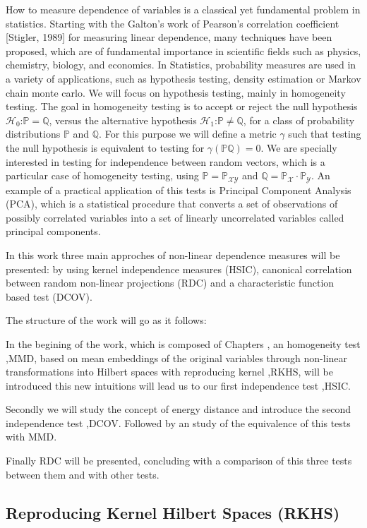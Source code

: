 How  to  measure  dependence  of  variables  is  a  classical yet fundamental problem in statistics.  Starting with the Galton’s work of Pearson’s correlation coefficient [Stigler, 1989] for measuring linear dependence,  many  techniques  have  been proposed, which are of fundamental importance in scientific fields such as physics, chemistry, biology, and economics.
In Statistics, probability measures are used in a variety of applications, such as hypothesis testing, density estimation or Markov chain monte carlo. We will focus on hypothesis testing, mainly in homogeneity testing. 
The goal in homogeneity testing is to accept or reject the null hypothesis $\mathcal{H}_{0}$:$\mathbb{P}=\mathbb{Q}$, versus the alternative hypothesis $\mathcal{H}_{1}$:$\mathbb{P}\neq\mathbb{Q}$, for a class of probability distributions $\mathbb{P}$ and $\mathbb{Q}$. For this purpose we will define a metric $\gamma$ such that testing the null hypothesis is equivalent to testing for $\gamma(\mathbb{P}\mathbb{Q}) = 0$. We are specially interested in testing for independence between random vectors, which is a particular case of homogeneity testing, using $\mathbb{P} = \mathbb{P}_{\mathcal{XY}}$ and $\mathbb{Q} = \mathbb{P}_{\mathcal{X}}\cdot\mathbb{P}_{\mathcal{Y}}$. An example of a practical application of this tests is Principal Component Analysis (PCA), which is a statistical procedure that converts a set of observations of possibly correlated variables into a set of linearly uncorrelated variables called principal components. 

In this work three main approches of non-linear dependence measures will be presented: by using kernel independence measures (HSIC), canonical correlation between random non-linear projections (RDC) and a characteristic function based test (DCOV).

The structure of the work will go as it follows:

In the begining of the work, which is composed of Chapters , an homogeneity test ,MMD, based on mean embeddings of the original variables through non-linear transformations into Hilbert spaces with reproducing kernel ,RKHS, will be introduced this new intuitions will lead us to our first independence test ,HSIC.

Secondly we will study the concept of energy distance and introduce the second independence test ,DCOV. Followed by an study of the equivalence of this tests with MMD.

Finally RDC will be presented, concluding with a comparison of this three tests between them and with other tests. 

\subsection{Reproducing Kernel Hilbert Spaces (RKHS)}



